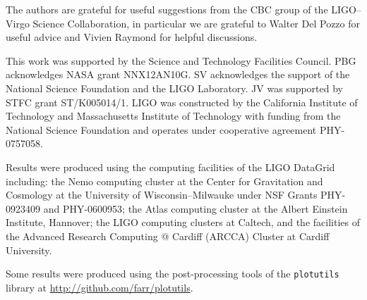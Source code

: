 \acknowledgements

The authors are grateful for useful suggestions from the CBC group of the LIGO--Virgo Science Collaboration, in particular we are grateful to Walter Del Pozzo for useful advice and Vivien Raymond for helpful discussions.

This work was supported by the Science and Technology Facilities Council. PBG acknowledges NASA grant NNX12AN10G. SV acknowledges the support of the National Science Foundation and the LIGO Laboratory. JV was supported by STFC grant ST/K005014/1. LIGO was constructed by the California Institute of Technology and Massachusetts Institute of Technology with funding from the National Science Foundation and operates under cooperative agreement PHY-0757058.

Results were produced using the computing facilities of the LIGO DataGrid including: the Nemo computing cluster at the Center for Gravitation and Cosmology at the University of Wisconsin--Milwauke under NSF Grants PHY-0923409 and PHY-0600953; the Atlas computing cluster at the Albert Einstein Institute, Hannover; the LIGO computing clusters at Caltech, and the facilities of the Advanced Research Computing @ Cardiff (ARCCA) Cluster at Cardiff University.

Some results were produced using the post-processing tools of the \texttt{plotutils} library at \url{http://github.com/farr/plotutils}.
  
  